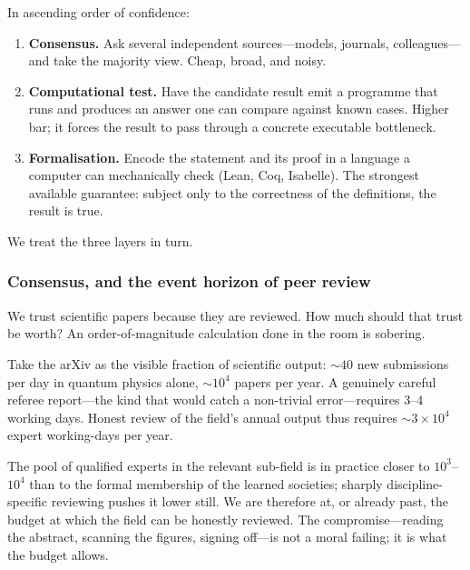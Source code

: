 \begin{keyresult}\label{kr:verification}
  In ascending order of confidence:
  \begin{enumerate}[(1)]
    \item \textbf{Consensus.}  Ask several independent
      sources---models, journals, colleagues---and take the
      majority view.  Cheap, broad, and noisy.
    \item \textbf{Computational test.}  Have the candidate
      result emit a programme that runs and produces an
      answer one can compare against known cases.  Higher
      bar; it forces the result to pass through a concrete
      executable bottleneck.
    \item \textbf{Formalisation.}  Encode the statement and
      its proof in a language a computer can mechanically
      check (Lean, Coq, Isabelle).  The strongest available
      guarantee: subject only to the correctness of the
      definitions, the result is true.
  \end{enumerate}
\end{keyresult}

We treat the three layers in turn.

\subsubsection*{Consensus, and the event horizon of peer review}

We trust scientific papers because they are reviewed.  How
much should that trust be worth?  An order-of-magnitude
calculation done in the room is sobering.

\begin{keyresult}\label{kr:event-horizon}
  Take the arXiv as the visible fraction of scientific
  output: $\sim40$ new submissions per day in quantum physics
  alone, $\sim10^4$ papers per year.  A genuinely careful
  referee report---the kind that would catch a non-trivial
  error---requires $3$--$4$ working days.  Honest review of
  the field's annual output thus requires $\sim3 \times 10^4$
  expert working-days per year.

  The pool of qualified experts in the relevant sub-field is
  in practice closer to $10^3$--$10^4$ than to the formal
  membership of the learned societies; sharply discipline-
  specific reviewing pushes it lower still.  We are therefore
  at, or already past, the budget at which the field can be
  honestly reviewed.  The compromise---reading the abstract,
  scanning the figures, signing off---is not a moral failing;
  it is what the budget allows.
\end{keyresult}

